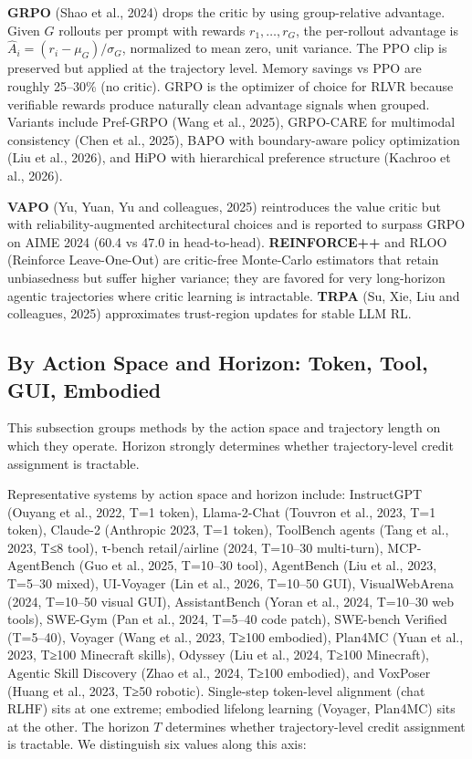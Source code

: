 \textbf{GRPO} (Shao et al., 2024) drops the critic by using group-relative advantage. Given \(G\) rollouts per prompt with rewards \(r_1, \ldots, r_G\), the per-rollout advantage is \(\hat A_i = (r_i - \mu_G)/\sigma_G\), normalized to mean zero, unit variance. The PPO clip is preserved but applied at the trajectory level. Memory savings vs PPO are roughly 25--30\% (no critic). GRPO is the optimizer of choice for RLVR because verifiable rewards produce naturally clean advantage signals when grouped. Variants include Pref-GRPO (Wang et al., 2025), GRPO-CARE for multimodal consistency (Chen et al., 2025), BAPO with boundary-aware policy optimization (Liu et al., 2026), and HiPO with hierarchical preference structure (Kachroo et al., 2026).

\textbf{VAPO} (Yu, Yuan, Yu and colleagues, 2025) reintroduces the value critic but with reliability-augmented architectural choices and is reported to surpass GRPO on AIME 2024 (60.4 vs 47.0 in head-to-head). \textbf{REINFORCE++} and RLOO (Reinforce Leave-One-Out) are critic-free Monte-Carlo estimators that retain unbiasedness but suffer higher variance; they are favored for very long-horizon agentic trajectories where critic learning is intractable. \textbf{TRPA} (Su, Xie, Liu and colleagues, 2025) approximates trust-region updates for stable LLM RL.

\subsection{By Action Space and Horizon: Token, Tool, GUI, Embodied}\label{by-action-space-and-horizon-token-tool-gui-embodied}

This subsection groups methods by the action space and trajectory length on which they operate. Horizon strongly determines whether trajectory-level credit assignment is tractable.

Representative systems by action space and horizon include: InstructGPT (Ouyang et al., 2022, T=1 token), Llama-2-Chat (Touvron et al., 2023, T=1 token), Claude-2 (Anthropic 2023, T=1 token), ToolBench agents (Tang et al., 2023, T≤8 tool), τ-bench retail/airline (2024, T=10--30 multi-turn), MCP-AgentBench (Guo et al., 2025, T=10--30 tool), AgentBench (Liu et al., 2023, T=5--30 mixed), UI-Voyager (Lin et al., 2026, T=10--50 GUI), VisualWebArena (2024, T=10--50 visual GUI), AssistantBench (Yoran et al., 2024, T=10--30 web tools), SWE-Gym (Pan et al., 2024, T=5--40 code patch), SWE-bench Verified (T=5--40), Voyager (Wang et al., 2023, T≥100 embodied), Plan4MC (Yuan et al., 2023, T≥100 Minecraft skills), Odyssey (Liu et al., 2024, T≥100 Minecraft), Agentic Skill Discovery (Zhao et al., 2024, T≥100 embodied), and VoxPoser (Huang et al., 2023, T≥50 robotic). Single-step token-level alignment (chat RLHF) sits at one extreme; embodied lifelong learning (Voyager, Plan4MC) sits at the other. The horizon \(T\) determines whether trajectory-level credit assignment is tractable. We distinguish six values along this axis:

